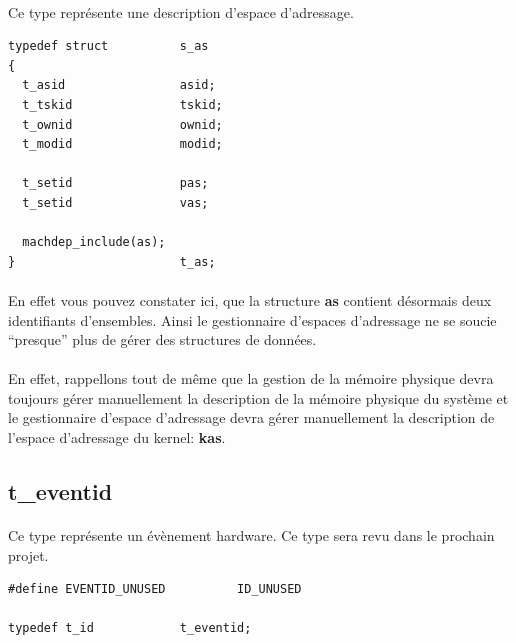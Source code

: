 \documentclass[10pt,a4wide]{article}
\begin{document}
\paragraph{}

Ce type repr\'esente une description d'espace d'adressage.

\begin{verbatim}
typedef struct          s_as
{
  t_asid                asid;
  t_tskid               tskid;
  t_ownid               ownid;
  t_modid               modid;

  t_setid               pas;
  t_setid               vas;

  machdep_include(as);
}                       t_as;
\end{verbatim}

\paragraph{}

En effet vous pouvez constater ici, que la structure \textbf{as} contient
d\'esormais deux identifiants d'ensembles. Ainsi le gestionnaire d'espaces
d'adressage ne se soucie ``presque'' plus de g\'erer des structures de
donn\'ees.

\paragraph{}

En effet, rappellons tout de m\^eme que la gestion de la m\'emoire physique
devra toujours g\'erer manuellement la description de la m\'emoire physique
du syst\`eme et le gestionnaire d'espace d'adressage devra g\'erer
manuellement la description de l'espace d'adressage du kernel: \textbf{kas}.

\subsection{t\_eventid}

\paragraph{}

Ce type repr\'esente un \'ev\`enement hardware. Ce type sera revu dans
le prochain projet.

\begin{verbatim}
#define EVENTID_UNUSED          ID_UNUSED

typedef t_id            t_eventid;
\end{verbatim}
\end{document}
